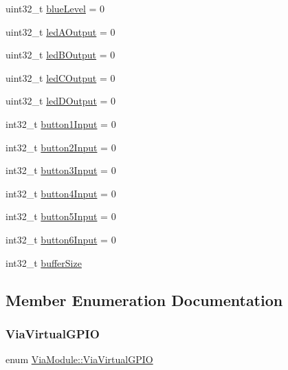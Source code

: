 \begin{DoxyCompactItemize}
uint32\+\_\+t \mbox{\hyperlink{class_via_module_a18580be93f8001ff48a2d413318b79c2}{blue\+Level}} = 0
\item 
uint32\+\_\+t \mbox{\hyperlink{class_via_module_a8bbc2b1b6b811030a29c54eb2267402d}{led\+A\+Output}} = 0
\item 
uint32\+\_\+t \mbox{\hyperlink{class_via_module_abfc55b0fb546b1aae419628d5af83b31}{led\+B\+Output}} = 0
\item 
uint32\+\_\+t \mbox{\hyperlink{class_via_module_a28272e553fd741627d2661b2971f931f}{led\+C\+Output}} = 0
\item 
uint32\+\_\+t \mbox{\hyperlink{class_via_module_a3a36a2d911549950d6eca39b2f05029d}{led\+D\+Output}} = 0
\item 
int32\+\_\+t \mbox{\hyperlink{class_via_module_a8b54c1c283ce508654c6ca3d501d1d4b}{button1\+Input}} = 0
\item 
int32\+\_\+t \mbox{\hyperlink{class_via_module_a2bad7b5f68752daadf61d48f837416f2}{button2\+Input}} = 0
\item 
int32\+\_\+t \mbox{\hyperlink{class_via_module_a37d126e1b41834d01396d745c57c966b}{button3\+Input}} = 0
\item 
int32\+\_\+t \mbox{\hyperlink{class_via_module_a9ada50e4526b70a798cc59a108befcfa}{button4\+Input}} = 0
\item 
int32\+\_\+t \mbox{\hyperlink{class_via_module_a56d68d397aecce9d7ca1c4f36f556586}{button5\+Input}} = 0
\item 
int32\+\_\+t \mbox{\hyperlink{class_via_module_aa4afb6bc99e668e10cdd83dd8f6aeec5}{button6\+Input}} = 0
\item 
int32\+\_\+t \mbox{\hyperlink{class_via_module_abf2754a9decc1a6e8ca8d17bbc810277}{buffer\+Size}}
\end{DoxyCompactItemize}


\subsection{Member Enumeration Documentation}
\mbox{\label{class_via_module_a1b83ad8b5871ad71e582502e9c252eb6}} 
\subsubsection{\texorpdfstring{Via\+Virtual\+G\+P\+IO}{ViaVirtualGPIO}}
{\footnotesize\ttfamily enum \mbox{\hyperlink{class_via_module_a1b83ad8b5871ad71e582502e9c252eb6}{Via\+Module\+::\+Via\+Virtual\+G\+P\+IO}}}

